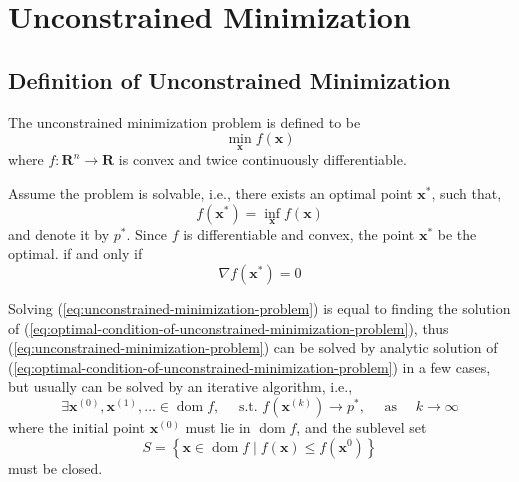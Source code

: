 \chapter{Unconstrained Minimization}

\section{Definition of Unconstrained Minimization}

\begin{definition}
    The unconstrained minimization problem is defined to be
    \begin{equation}
        \min_{\mathbf{x}}f(\mathbf{x})
        \label{eq:unconstrained-minimization-problem}
    \end{equation}
    where $f:\mathbf{R}^n\rightarrow\mathbf{R}$ is convex and twice continuously differentiable.
\end{definition}

Assume the problem is solvable, i.e., there exists an optimal point $\mathbf{x}^{*}$, such that,
\begin{equation*}
    f(\mathbf{x}^{*})=\inf_{\mathbf{x}}f(\mathbf{x})
\end{equation*}
and denote it by $p^{*}$. Since $f$ is differentiable and convex, the point $\mathbf{x}^{*}$ be the optimal. if and only if
\begin{equation}
    \nabla f(\mathbf{x}^{*})=0
    \label{eq:optimal-condition-of-unconstrained-minimization-problem}
\end{equation}

Solving (\ref{eq:unconstrained-minimization-problem}) is equal to finding the solution of (\ref{eq:optimal-condition-of-unconstrained-minimization-problem}), thus (\ref{eq:unconstrained-minimization-problem}) can be solved by analytic solution of (\ref{eq:optimal-condition-of-unconstrained-minimization-problem}) in a few cases, but usually can be solved by an iterative algorithm, i.e.,
\begin{equation*}
    \exists\mathbf{x}^{(0)},\mathbf{x}^{(1)},\ldots\in\operatorname{dom}f,\quad\text{ s.t. }f(\mathbf{x}^{(k)})\rightarrow p^{*},\quad\text{ as }\quad k\rightarrow\infty
\end{equation*}
where the initial point $\mathbf{x}^{(0)}$ must lie in $\operatorname{dom}f$, and the sublevel set $$S=\left\{\mathbf{x}\in\operatorname{dom}f\mid f(\mathbf{x})\leq f(\mathbf{x}^{0})\right\}$$ must be closed.

